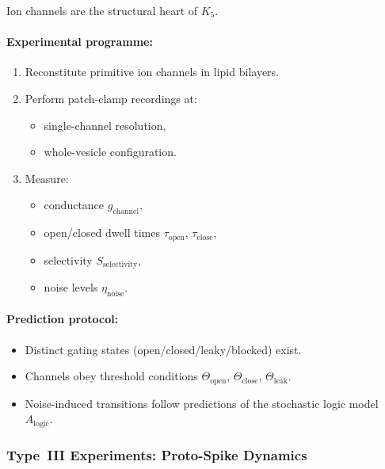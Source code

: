 Ion channels are the structural heart of $K_5$.

\paragraph{Experimental programme:}

\begin{enumerate}
    \item Reconstitute primitive ion channels in lipid bilayers.
    \item Perform patch-clamp recordings at:
          \begin{itemize}
              \item single-channel resolution,
              \item whole-vesicle configuration.
          \end{itemize}
    \item Measure:
          \begin{itemize}
              \item conductance $g_{\mathrm{channel}}$,
              \item open/closed dwell times $\tau_{\mathrm{open}}$, $\tau_{\mathrm{close}}$,
              \item selectivity $S_{\mathrm{selectivity}}$,
              \item noise levels $\eta_{\mathrm{noise}}$.
          \end{itemize}
\end{enumerate}

\paragraph{Prediction protocol:}

\begin{itemize}
    \item Distinct gating states (open/closed/leaky/blocked) exist.
    \item Channels obey threshold conditions 
          $\Theta_{\mathrm{open}}$, $\Theta_{\mathrm{close}}$, $\Theta_{\mathrm{leak}}$.
    \item Noise-induced transitions follow predictions of the 
          stochastic logic model $A_{\mathrm{logic}}$.
\end{itemize}



\subsubsection{Type~III Experiments: Proto-Spike Dynamics}

